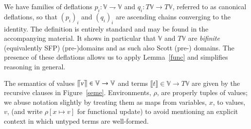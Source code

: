 \documentclass[nocopyrightspace,preprint]{sigplanconf}
\newcommand{\partfun}{\rightharpoondown}
\newcommand{\semC}[1]{\ensuremath{\llbracket {#1} \rrbracket}}
\newcommand{\semV}[1]{\ensuremath{\llceil {#1} \rrceil
}}
\newcommand{\Values}{\mathbb{V}}
\begin{document}
We have families of deflations $p_i:\Values\partfun\Values$ and $q_i:
T\Values\rightarrow T\Values$, referred to as canonical deflations, so
that $(p_i)_i$ and $(q_i)_i$ are ascending chains converging to the
identity. The definition is entirely standard and may be found in the
accompanying material. It shows in particular that $\Values$ and
$T\Values$ are \emph{bifinite} (equivalently SFP) (pre-)domains
\cite{Abramsky94domaintheory} and as such also Scott (pre-)
domains. The presence of these deflations allows us to apply
Lemma~\ref{func} and simplifies reasoning in general.

The semantics of values $\semV{v}\in\Values\rightarrow\Values$ and
terms $\semC{t}\in\Values\rightarrow T\Values$ are given by the
recursive clauses in Figure~\ref{seme}. Environments, $\rho$, are properly tuples of values; we abuse notation slightly by treating them as maps from variables, $x$, to values, $v$, (and write $\rho[x{\mapsto}v]$ for functional update) to avoid mentioning an explicit context in which untyped terms are well-formed.
\end{document}
